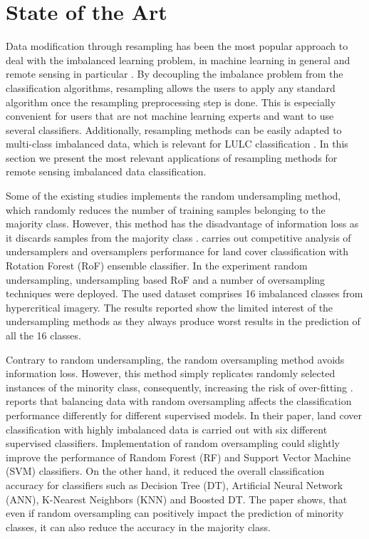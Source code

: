 \documentclass[parskip=full]{scrartcl}
\begin{document}
\section{State of the Art}

Data modification through resampling has been the most popular approach to deal
with the imbalanced learning problem, in machine learning in general
\cite{Douzas2019} and remote sensing in particular \cite{Feng2019}. By
decoupling the imbalance problem from the classification algorithms, resampling
allows the users to apply any standard algorithm once the resampling
preprocessing step is done. This is especially convenient for users that are
not machine learning experts and want to use several classifiers. Additionally,
resampling methods can be easily adapted to multi-class imbalanced data, which
is relevant for LULC classification \cite{Feng2019}. In this section we present
the most relevant applications of resampling methods for remote sensing
imbalanced data classification.

Some of the existing studies implements the random undersampling method,
which randomly reduces the number of training samples  belonging to the
majority class. However, this method has the disadvantage of information loss
as it discards samples from the majority class  \cite{Feng2019}.
\cite{Feng2018} carries out competitive analysis of  undersamplers and
oversamplers performance for land cover classification with  Rotation Forest
(RoF) ensemble classifier. In the experiment random  undersampling,
undersampling based RoF and a number of oversampling techniques  were deployed.
The used dataset comprises 16 imbalanced classes from  hypercritical imagery.
The results reported show the limited interest of the  undersampling methods as
they always produce worst results in the prediction of all the 16 classes.

Contrary to random undersampling, the random oversampling method avoids
information loss. However, this method simply replicates randomly selected
instances of the minority class, consequently, increasing the risk of
over-fitting \cite{Krawczyk2016}. \cite{Maxwell2018} reports that balancing
data with random oversampling affects the classification performance
differently for different supervised models. In their paper, land cover
classification with highly imbalanced data is carried out with six different
supervised classifiers. Implementation of random oversampling could slightly
improve the performance of Random Forest (RF) and Support Vector Machine (SVM)
classifiers. On the other hand, it reduced the overall classification accuracy
for classifiers such as Decision Tree (DT), Artificial Neural Network (ANN),
K-Nearest Neighbors (KNN) and Boosted DT. The paper shows, that even if random
oversampling can positively impact the prediction of minority classes,
it can also reduce the accuracy in the majority class.
\end{document}
